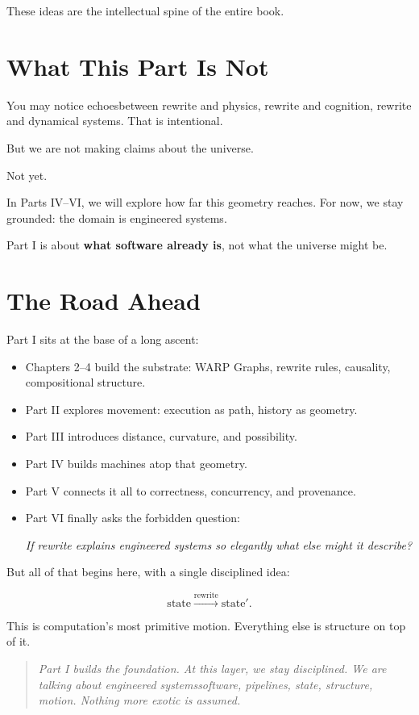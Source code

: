 These ideas are the intellectual spine of the entire book.

\bigskip

\section*{What This Part Is Not}
\label{sec:not-yet}

You may notice echoes\emdash{}between rewrite and physics,
rewrite and cognition, rewrite and dynamical systems.
That is intentional.

But we are not making claims about the universe.

Not yet.

In Parts IV–VI, we will explore how far this geometry reaches.
For now, we stay grounded: the domain is engineered systems.

Part I is about \textbf{what software already is},  
not what the universe might be.

\bigskip

\section*{The Road Ahead}
\label{sec:road-ahead}

Part I sits at the base of a long ascent:

\begin{itemize}
    \item Chapters 2–4 build the substrate: WARP Graphs, rewrite rules,
    causality, compositional structure.
    \item Part II explores movement: execution as path, history as geometry.
    \item Part III introduces distance, curvature, and possibility.
    \item Part IV builds machines atop that geometry.
    \item Part V connects it all to correctness, concurrency, and provenance.
    \item Part VI finally asks the forbidden question:  
    \begin{center}
        \emph{If rewrite explains engineered systems so elegantly\emdash{}  
        what else might it describe?}
    \end{center}
\end{itemize}

But all of that begins here, with a single disciplined idea:

\[
\text{state} \xrightarrow{\text{rewrite}} \text{state}'.
\]

This is computation’s most primitive motion.  
Everything else is structure on top of it.

\begin{quote}
\emph{Part I builds the foundation. At this layer, we stay disciplined.  
We are talking about engineered systems\emdash{}software, pipelines, state, structure, motion.  
Nothing more exotic is assumed.}
\end{quote}

\bigskip
